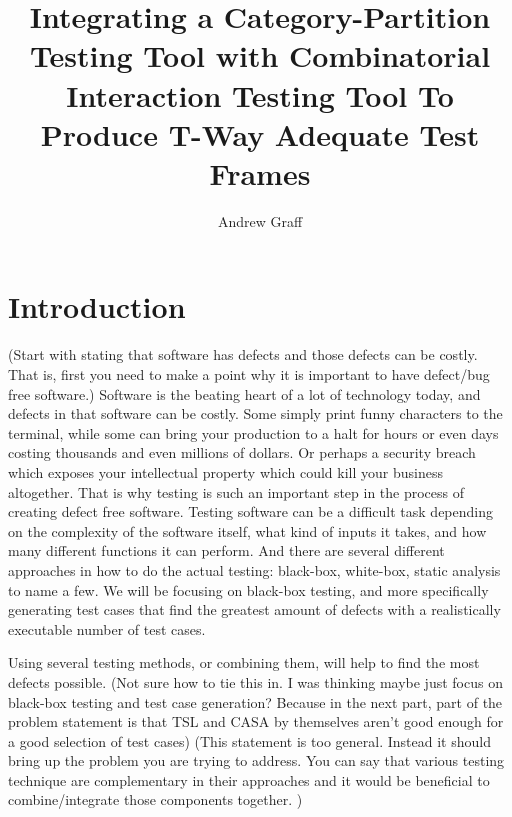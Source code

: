 \documentclass[a4full,12pt]{article}
\title{Integrating a Category-Partition Testing Tool with Combinatorial Interaction
Testing Tool To Produce T-Way Adequate Test Frames}
\author{Andrew Graff}
\newcommand{\eas}[1]{{\color{blue}\sf ({#1})}}
\newcommand{\ag}[1]{{\color{red}\sf ({#1})}}
\begin{document}
\maketitle
\section{Introduction}
\eas{Start with stating that software has defects and those defects can be costly. That is, first you need to make a point why it is important to have defect/bug free software.}
Software is the beating heart of a lot of technology today, and defects in that software
  can be costly. Some simply print funny characters to the terminal, while some can bring
  your production to a halt for hours or even days costing thousands and even millions of
  dollars. Or perhaps a security breach which exposes your intellectual property which
  could kill your business altogether. That is why testing is such an important step in
  the process of creating defect free software. Testing software can be a difficult task
  depending on the complexity of the software itself, what kind of inputs it takes, and how
  many different functions it can perform. And there are several different approaches in how
  to do the actual testing: black-box, white-box, static analysis to name a few. We will be
  focusing on black-box testing, and more specifically generating test cases that find the
  greatest amount of defects with a realistically executable number of test cases.
  
  
  Using several testing methods, or combining them, will help to find the most defects possible.
  \ag{Not sure how to tie this in. I was thinking maybe just focus on black-box testing and test
  case generation? Because in the next part, part of the problem statement is that TSL and CASA by themselves
  aren't good enough for a good selection of test cases}
  \eas{This statement is too general. Instead it should bring up the problem you are trying to address. 
  You can say that various testing technique are complementary in their approaches and it would be 
  beneficial to combine/integrate those components together. }
  
  
\end{document}

